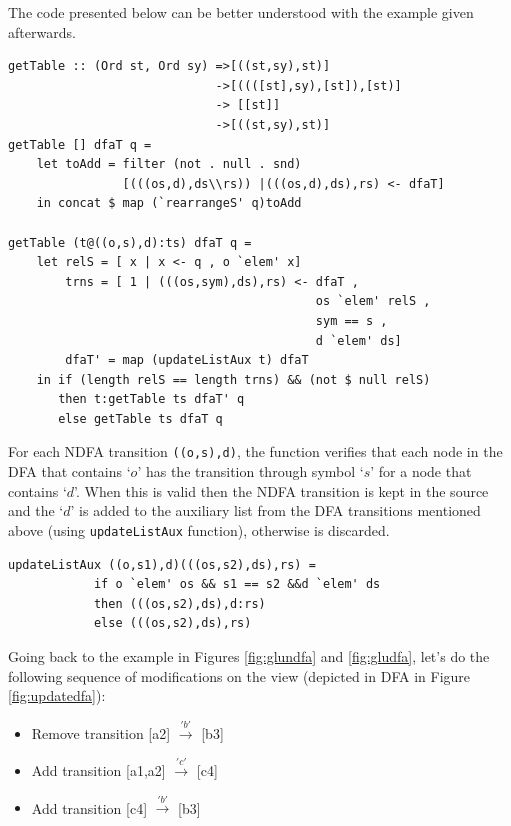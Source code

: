 The code presented below can be better understood with the example given afterwards. 

\begin{verbatim}
getTable :: (Ord st, Ord sy) =>[((st,sy),st)] 
                             ->[((([st],sy),[st]),[st)]
                             -> [[st]] 
                             ->[((st,sy),st)]
getTable [] dfaT q = 
    let toAdd = filter (not . null . snd)
                [(((os,d),ds\\rs)) |(((os,d),ds),rs) <- dfaT]
    in concat $ map (`rearrangeS' q)toAdd
    
getTable (t@((o,s),d):ts) dfaT q = 
    let relS = [ x | x <- q , o `elem' x]
        trns = [ 1 | (((os,sym),ds),rs) <- dfaT , 
                                           os `elem' relS ,
                                           sym == s , 
                                           d `elem' ds]
        dfaT' = map (updateListAux t) dfaT
    in if (length relS == length trns) && (not $ null relS) 
       then t:getTable ts dfaT' q
       else getTable ts dfaT q
\end{verbatim}

\vspace{5mm}
For each NDFA transition \texttt{((o,s),d)}, the function verifies that each node in the DFA that contains `$o$' has the transition through symbol `$s$' for a node that contains `$d$'. When this is valid then the NDFA transition is kept in the source and the `$d$' is added to the auxiliary list from the DFA transitions mentioned above (using \texttt{updateListAux} function), otherwise is discarded. 



\begin{verbatim}
updateListAux ((o,s1),d)(((os,s2),ds),rs) = 
            if o `elem' os && s1 == s2 &&d `elem' ds
            then (((os,s2),ds),d:rs)
            else (((os,s2),ds),rs)
\end{verbatim}

Going back to the example in Figures \ref{fig:glundfa} and \ref{fig:gludfa}, let's do the following sequence of modifications on the view (depicted in DFA in Figure \ref{fig:updatedfa}):

\begin{itemize}
    \item Remove transition [a2] $\xrightarrow{'b'}$ [b3]
    \item Add transition [a1,a2] $\xrightarrow{'c'}$ [c4]
    \item Add transition [c4] $\xrightarrow{'b'}$ [b3]
\end{itemize}


